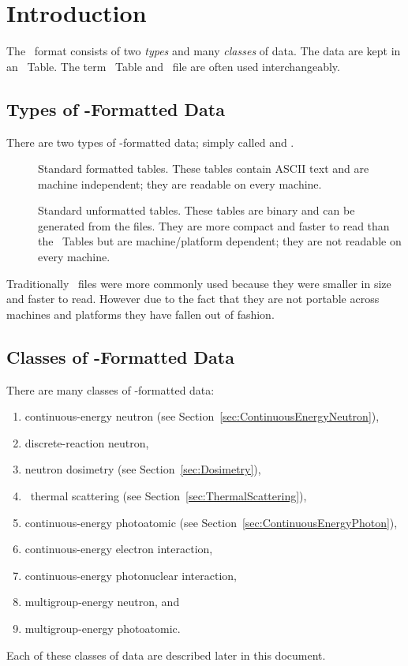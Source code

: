 \section{Introduction}\label{sec:Introduction}
The \ACE\ format consists of two \emph{types} and many \emph{classes} of data. The data are kept in an \ACE\ Table. The term \ACE\ Table and \ACE\ file are often used interchangeably.

\subsection{Types of \ACE-Formatted Data}
There are two types of \ACE-formatted data; simply called  and .
\begin{description}
  \item[] Standard formatted tables. These tables contain ASCII text and are machine independent; they are readable on every machine. 
  \item[] Standard unformatted tables. These tables are binary and can be generated from the  files. They are more compact and faster to read than the  \ACE\ Tables
 but are machine/platform dependent; they are not readable on every machine. 
\end{description}
Traditionally
  \ACE\ files were more commonly used because they were smaller in size and faster to read. However
 due to the fact that they are not portable across machines and platforms they have fallen out of fashion.

\subsection{Classes of \ACE-Formatted Data}
There are many classes of \ACE-formatted data:
\begin{enumerate}
  \item continuous-energy neutron (see Section~\ref{sec:ContinuousEnergyNeutron}),
  \item discrete-reaction neutron,
  \item neutron dosimetry (see Section~\ref{sec:Dosimetry}),
  \item \SaB\ thermal scattering (see Section~\ref{sec:ThermalScattering}),
  \item continuous-energy photoatomic (see Section~\ref{sec:ContinuousEnergyPhoton}),
  \item continuous-energy electron interaction,
  \item continuous-energy photonuclear interaction,
  \item multigroup-energy neutron, and
  \item multigroup-energy photoatomic.
\end{enumerate}
Each of these classes of data are described later in this document.

